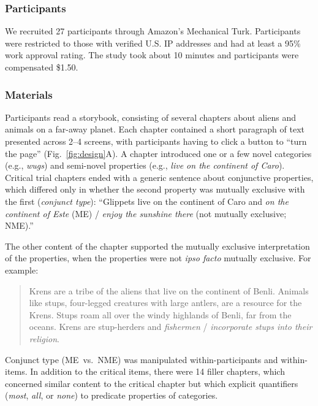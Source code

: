 \documentclass[10pt,letterpaper]{article}
\begin{document}
\subsubsection{Participants}
We recruited 27 participants through Amazon's Mechanical Turk.
Participants were restricted to those with verified U.S. IP addresses and had at least a 95\% work approval rating. 
The study took about 10 minutes and participants were compensated \$1.50.

\subsubsection{Materials}

Participants read a storybook, consisting of several chapters about aliens and animals on a far-away planet.
Each chapter contained a short paragraph of text presented across 2--4 screens, with participants having to click a button to ``turn the page'' (Fig.~\ref{fig:design}A).
A chapter introduced one or a few novel categories (e.g., \emph{wugs}) and semi-novel properties (e.g., \emph{live on the continent of Caro}).
Critical trial chapters ended with a generic sentence about conjunctive properties, which differed only in whether the second property was mutually exclusive with the first (\emph{conjunct type}): ``Glippets live on the continent of Caro and \emph{on the continent of Este} (ME) /  \emph{enjoy the sunshine there} (not mutually exclusive; NME).''

The other content of the chapter supported the mutually exclusive interpretation of the properties, when the properties were not \emph{ipso facto} mutually exclusive. For example: 

\vspace{-0.1cm}
\begin{quote}
\small
Krens are a tribe of the aliens that live on the continent of Benli. Animals like stups, four-legged creatures with large antlers, are a resource for the Krens. Stups roam all over the windy highlands of Benli, far from the oceans. Krens are stup-herders and \emph{fishermen} / \emph{incorporate stups into their religion}.
\end{quote}
\vspace{-0.1cm}


Conjunct type (ME~vs.~NME) was manipulated within-participants and within-items. 
In addition to the critical items, there were 14 filler chapters, which concerned similar content to the critical chapter but which explicit quantifiers (\emph{most}, \emph{all}, or \emph{none}) to predicate properties of categories. 
\end{document}
